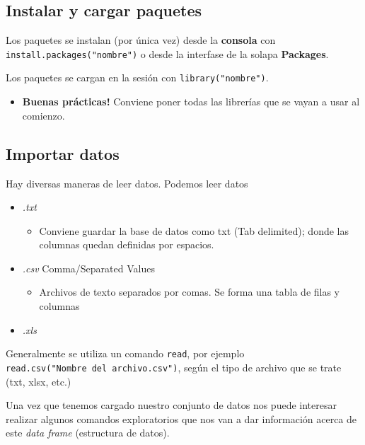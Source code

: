 \documentclass[
]{book}
\providecommand{\tightlist}{%
  \setlength{\itemsep}{0pt}\setlength{\parskip}{0pt}}
\begin{document}
\hypertarget{instalar-y-cargar-paquetes}{%
\subsection{\texorpdfstring{Instalar y cargar \textbf{paquetes}}{Instalar y cargar paquetes}}\label{instalar-y-cargar-paquetes}}

Los paquetes se instalan (por única vez) desde la \textbf{consola} con \texttt{install.packages("nombre")} o desde la interfase de la solapa \textbf{Packages}.

Los paquetes se cargan en la sesión con \texttt{library("nombre")}.

\begin{itemize}
\tightlist
\item
  \textbf{Buenas prácticas!} Conviene poner todas las librerías que se vayan a usar al comienzo.
\end{itemize}

\hypertarget{importar-datos}{%
\subsection{\texorpdfstring{Importar \textbf{datos}}{Importar datos}}\label{importar-datos}}

Hay diversas maneras de leer datos. Podemos leer datos

\begin{itemize}
\item
  \emph{.txt}

  \begin{itemize}
  \tightlist
  \item
    Conviene guardar la base de datos como txt (Tab delimited); donde las columnas quedan definidas por espacios.
  \end{itemize}
\item
  \emph{.csv} Comma/Separated Values

  \begin{itemize}
  \tightlist
  \item
    Archivos de texto separados por comas. Se forma una tabla de filas y columnas
  \end{itemize}
\item
  \emph{.xls}
\end{itemize}

Generalmente se utiliza un comando \texttt{read}, por ejemplo \texttt{read.csv("Nombre\ del\ archivo.csv")}, según el tipo de archivo que se trate (txt, xlsx, etc.)

Una vez que tenemos cargado nuestro conjunto de datos nos puede interesar realizar algunos comandos exploratorios que nos van a dar información acerca de este \emph{data frame} (estructura de datos).
\end{document}
